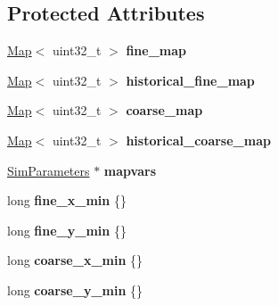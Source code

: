 \subsection*{Protected Attributes}
\begin{DoxyCompactItemize}
\item 
\hyperlink{class_map}{Map}$<$ uint32\+\_\+t $>$ {\bfseries fine\+\_\+map}\hypertarget{class_landscape_a8947e46b9be54b42a93fb0792d4a9ed4}{}\label{class_landscape_a8947e46b9be54b42a93fb0792d4a9ed4}

\item 
\hyperlink{class_map}{Map}$<$ uint32\+\_\+t $>$ {\bfseries historical\+\_\+fine\+\_\+map}\hypertarget{class_landscape_a5e34fe2e75c3b84657a4edc75f9fcdec}{}\label{class_landscape_a5e34fe2e75c3b84657a4edc75f9fcdec}

\item 
\hyperlink{class_map}{Map}$<$ uint32\+\_\+t $>$ {\bfseries coarse\+\_\+map}\hypertarget{class_landscape_a58c8bb6432b578dac46bdbdba9e759c9}{}\label{class_landscape_a58c8bb6432b578dac46bdbdba9e759c9}

\item 
\hyperlink{class_map}{Map}$<$ uint32\+\_\+t $>$ {\bfseries historical\+\_\+coarse\+\_\+map}\hypertarget{class_landscape_a5ac41db1c48869d974c97393eb548dd8}{}\label{class_landscape_a5ac41db1c48869d974c97393eb548dd8}

\item 
\hyperlink{struct_sim_parameters}{Sim\+Parameters} $\ast$ {\bfseries mapvars}\hypertarget{class_landscape_aa3de03e94cea3c560df40bfa78b79f54}{}\label{class_landscape_aa3de03e94cea3c560df40bfa78b79f54}

\item 
long {\bfseries fine\+\_\+x\+\_\+min} \{\}\hypertarget{class_landscape_a95634ae0e15826160ad5c58a4093130d}{}\label{class_landscape_a95634ae0e15826160ad5c58a4093130d}

\item 
long {\bfseries fine\+\_\+y\+\_\+min} \{\}\hypertarget{class_landscape_a90e7fe904c80133338ac19aa13534ef9}{}\label{class_landscape_a90e7fe904c80133338ac19aa13534ef9}

\item 
long {\bfseries coarse\+\_\+x\+\_\+min} \{\}\hypertarget{class_landscape_a39dba789588465fe23055988ac52f217}{}\label{class_landscape_a39dba789588465fe23055988ac52f217}

\item 
long {\bfseries coarse\+\_\+y\+\_\+min} \{\}\hypertarget{class_landscape_a23b1484f4694fbc2a7c79af8d5e3fce5}{}\label{class_landscape_a23b1484f4694fbc2a7c79af8d5e3fce5}


\end{DoxyCompactItemize}
